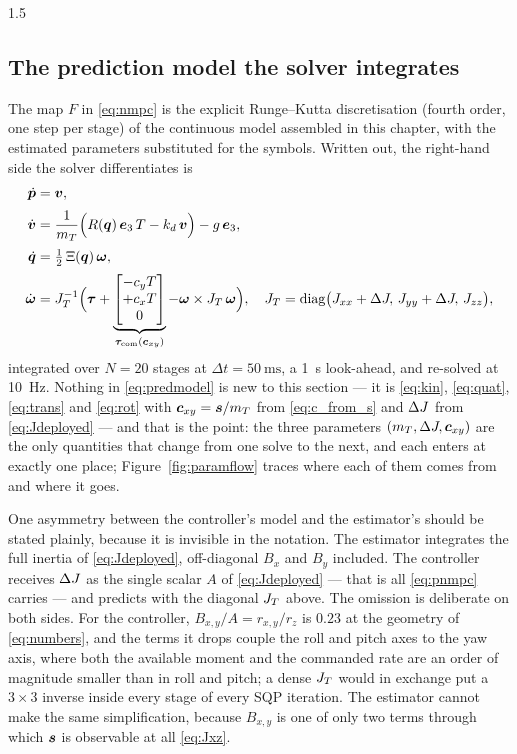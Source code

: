 \begin{spacing}{1.5}
\subsection{The prediction model the solver integrates}\label{sec:model:predmodel}

The map $F$ in \eqref{eq:nmpc} is the explicit Runge--Kutta discretisation
(fourth order, one step per stage) of the continuous model assembled in this
chapter, with the estimated parameters substituted for the symbols. Written out,
the right-hand side the solver differentiates is
\begin{align}
\dot{\bm p} &= \bm v, \nonumber\\[2pt]
\dot{\bm v} &= \frac{1}{m_T}\Bigl(R(\bm q)\,\bm{e}_3\,T - k_d\,\bm v\Bigr) - g\,\bm{e}_3,
\nonumber\\[2pt]
\dot{\bm q} &= \tfrac{1}{2}\,\Xi(\bm q)\,\bm\omega, \nonumber\\[2pt]
\dot{\bm\omega} &= J_T^{-1}\Bigl(
  \bm\tau
  + \underbrace{\begin{bmatrix} -c_y T \\ +c_x T \\ 0\end{bmatrix}}_{\bm{\tau}_{\mathrm{com}}(\bm{c}_{xy})}
  - \bm\omega \times J_T\,\bm\omega \Bigr),
\quad
J_T = \mathrm{diag}\bigl(J_{xx}+\Delta J,\, J_{yy}+\Delta J,\, J_{zz}\bigr),
\label{eq:predmodel}
\end{align}
integrated over $N=20$ stages at $\Delta t = \SI{50}{\milli\second}$, a
\SI{1}{\second} look-ahead, and re-solved at \SI{10}{\hertz}. Nothing in
\eqref{eq:predmodel} is new to this section --- it is \eqref{eq:kin},
\eqref{eq:quat}, \eqref{eq:trans} and \eqref{eq:rot} with $\bm{c}_{xy} = \bm{s}/m_T$
from \eqref{eq:c_from_s} and $\Delta J$ from \eqref{eq:Jdeployed} --- and that is the
point: the three parameters $(m_T, \Delta J, \bm{c}_{xy})$ are the only quantities that
change from one solve to the next, and each enters at exactly one place;
Figure~\ref{fig:paramflow} traces where each of them comes from and where it
goes.

One asymmetry between the controller's model and the estimator's should be stated
plainly, because it is invisible in the notation. The estimator integrates the
full inertia of \eqref{eq:Jdeployed}, off-diagonal $B_x$ and $B_y$ included. The
controller receives $\Delta J$ as the single scalar $A$ of \eqref{eq:Jdeployed} ---
that is all \eqref{eq:pnmpc} carries --- and predicts with the diagonal $J_T$
above. The omission is deliberate on both sides. For the controller,
$B_{x,y}/A = r_{x,y}/r_z$ is $0.23$ at the geometry of \eqref{eq:numbers}, and the
terms it drops couple the roll and pitch axes to the yaw axis, where both the
available moment and the commanded rate are an order of magnitude smaller than in
roll and pitch; a dense $J_T$ would in exchange put a $3\times 3$ inverse inside
every stage of every SQP iteration. The estimator cannot make the same
simplification, because $B_{x,y}$ is one of only two terms through which $\bm{s}$
is observable at all \eqref{eq:Jxz}.


\end{spacing}
